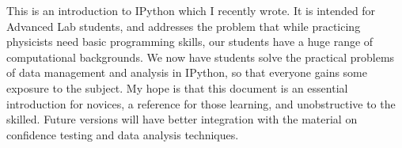 \documentclass{article}
\begin{document}
\thispagestyle{empty} 

\noindent
This is an introduction to IPython which I recently wrote. It is intended for
Advanced Lab students, and addresses the problem that while practicing
physicists need basic programming skills, our students have a huge range of
computational backgrounds. We now have students solve the practical problems of
data management and analysis in IPython, so that everyone gains some exposure to
the subject. My hope is that this document is an essential introduction for
novices, a reference for those learning, and unobstructive to the
skilled. Future versions will have better integration with the material on
confidence testing and data analysis techniques.

\vfill 
\newpage

\end{document}
